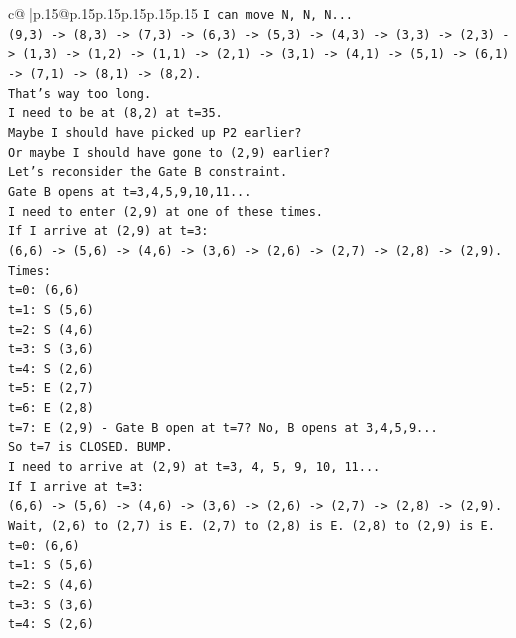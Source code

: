 \documentclass{article}
\begin{document}
{\begin{supertabular}{c@{$\;$}|p{.15\linewidth}@{}p{.15\linewidth}p{.15\linewidth}p{.15\linewidth}p{.15\linewidth}p{.15\linewidth}}
{{{\texttt{I can move N, N, N...} \\
\texttt{(9,3) {-}> (8,3) {-}> (7,3) {-}> (6,3) {-}> (5,3) {-}> (4,3) {-}> (3,3) {-}> (2,3) {-}> (1,3) {-}> (1,2) {-}> (1,1) {-}> (2,1) {-}> (3,1) {-}> (4,1) {-}> (5,1) {-}> (6,1) {-}> (7,1) {-}> (8,1) {-}> (8,2).} \\
\texttt{That's way too long.} \\
\texttt{I need to be at (8,2) at t=35.} \\
\texttt{Maybe I should have picked up P2 earlier?} \\
\texttt{Or maybe I should have gone to (2,9) earlier?} \\
\texttt{Let's reconsider the Gate B constraint.} \\
\texttt{Gate B opens at t=3,4,5,9,10,11...} \\
\texttt{I need to enter (2,9) at one of these times.} \\
\texttt{If I arrive at (2,9) at t=3:} \\
\texttt{(6,6) {-}> (5,6) {-}> (4,6) {-}> (3,6) {-}> (2,6) {-}> (2,7) {-}> (2,8) {-}> (2,9).} \\
\texttt{Times:} \\
\texttt{t=0: (6,6)} \\
\texttt{t=1: S (5,6)} \\
\texttt{t=2: S (4,6)} \\
\texttt{t=3: S (3,6)} \\
\texttt{t=4: S (2,6)} \\
\texttt{t=5: E (2,7)} \\
\texttt{t=6: E (2,8)} \\
\texttt{t=7: E (2,9) {-} Gate B open at t=7? No, B opens at 3,4,5,9...} \\
\texttt{So t=7 is CLOSED. BUMP.} \\
\texttt{I need to arrive at (2,9) at t=3, 4, 5, 9, 10, 11...} \\
\texttt{If I arrive at t=3:} \\
\texttt{(6,6) {-}> (5,6) {-}> (4,6) {-}> (3,6) {-}> (2,6) {-}> (2,7) {-}> (2,8) {-}> (2,9).} \\
\texttt{Wait, (2,6) to (2,7) is E. (2,7) to (2,8) is E. (2,8) to (2,9) is E.} \\
\texttt{t=0: (6,6)} \\
\texttt{t=1: S (5,6)} \\
\texttt{t=2: S (4,6)} \\
\texttt{t=3: S (3,6)} \\
\texttt{t=4: S (2,6)} \\
}}}
\end{supertabular}}
\end{document}

